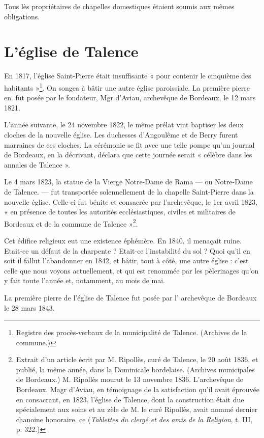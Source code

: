 Tous lès propriétaires de chapelles domestiques étaient soumis aux mêmes obligations.

\section{L'église de Talence}

En 1817, l'église Saint-Pierre était insuffisante « pour contenir le cinquième des habitants »\footnote{Registre des procès-verbaux de la municipalité de Talence. (Archives de la commune.)}. On songea à bâtir une autre église paroissiale. La première pierre en. fut posée par le fondateur, Mgr d'Aviau, archevêque de Bordeaux, le 12 mars 1821.

L'année suivante, le 24 novembre 1822, le même prélat vint baptiser les deux cloches de la nouvelle église. Les duchesses d'Angoulême et de Berry furent marraines de ces cloches. La cérémonie se fit avec une telle pompe qu'un journal de Bordeaux, en la décrivant, déclara que cette journée serait « célèbre dans les annales de Talence ». 

Le 4 mars 1823, la statue de la Vierge Notre-Dame de Rama — ou Notre-Dame de Talence. — fut transportée solennellement de la chapelle Saint-Pierre dans la nouvelle église. Celle-ci fut bénite et consacrée par l'archevêque, le 1er avril 1823, « en présence de toutes les autorités ecclésiastiques, civiles et militaires de Bordeaux et de la commune de Talence »\footnote{Extrait d'un article écrit par M. Ripollès, curé de Talence, le 20 août 1836, et publié, la même année, dans la Dominicale bordelaise. (Archives municipales de Bordeaux.) M. Ripollès mourut le 13 novembre 1836. L'archevêque de Bordeaux. Magr d'Aviau, en témoignage de la satisfaction qu'il avait éprouvée en consacrant, en 1823, l'église de Talence, dont la construction était due spécialement aux soins et au zèle de M. le curé Ripollès, avait nommé dernier chanoine honoraire. ce (\textit{Tablettes du clergé et des amis de la Religion}, t. III, p. 322.)}.

Cet édifice religieux eut une existence éphémère. En 1840, il menaçait ruine. Etait-ce un défaut de la charpente ? Etait-ce l'instabilité du sol ? Quoi qu'il en soit il fallut l'abandonner en 1842, et bâtir, tout à côté, une autre église : c'est celle que nous voyons actuellement, et qui est renommée par les pèlerinages qu'on y fait toute l'année et, notamment, au mois de mai.

La première pierre de l'église de Talence fut posée par l' archevêque de Bordeaux le 28 mars 1843.

